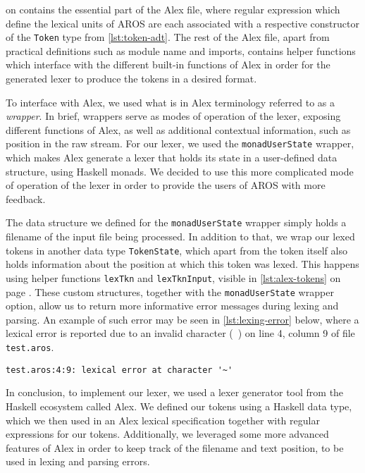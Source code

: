 \par {} on  contains the essential part of the Alex file, where regular expression which define the lexical units of AROS are each associated with a respective constructor of the \lstinline{Token} type from \cref{lst:token-adt}. The rest of the Alex file, apart from practical definitions such as module name and imports, contains helper functions which interface with the different built-in functions of Alex in order for the generated lexer to produce the tokens in a desired format.
\par To interface with Alex, we used what is in Alex terminology referred to as a \textit{wrapper}. In brief, wrappers serve as modes of operation of the lexer, exposing different functions of Alex, as well as additional contextual information, such as position in the raw stream. For our lexer, we used the \lstinline{monadUserState} wrapper, which makes Alex generate a lexer that holds its state in a user-defined data structure, using Haskell monads. We decided to use this more complicated mode of operation of the lexer in order to provide the users of AROS with more feedback.\cite{alexUserGuide}
\par The data structure we defined for the \lstinline{monadUserState} wrapper simply holds a filename of the input file being processed. In addition to that, we wrap our lexed tokens in another data type \lstinline{TokenState}, which apart from the token itself also holds information about the position at which this token was lexed. This happens using helper functions \lstinline{lexTkn} and \lstinline{lexTknInput}, visible in \cref{lst:alex-tokens} on page . These custom structures, together with the \lstinline{monadUserState} wrapper option, allow us to return more informative error messages during lexing and parsing. An example of such error may be seen in \cref{lst:lexing-error} below, where a lexical error is reported due to an invalid character (~) on line 4, column 9 of file \lstinline{test.aros}.
\begin{lstlisting}[numbers=none,
caption=Example of an error message reported due to a lexical error in AROS,
label=lst:lexing-error]
test.aros:4:9: lexical error at character '~'
\end{lstlisting}
\par
In conclusion, to implement our lexer, we used a lexer generator tool from the Haskell ecosystem called Alex. We defined our tokens using a Haskell data type, which we then used in an Alex lexical specification together with regular expressions for our tokens. Additionally, we leveraged some more advanced features of Alex in order to keep track of the filename and text position, to be used in lexing and parsing errors.